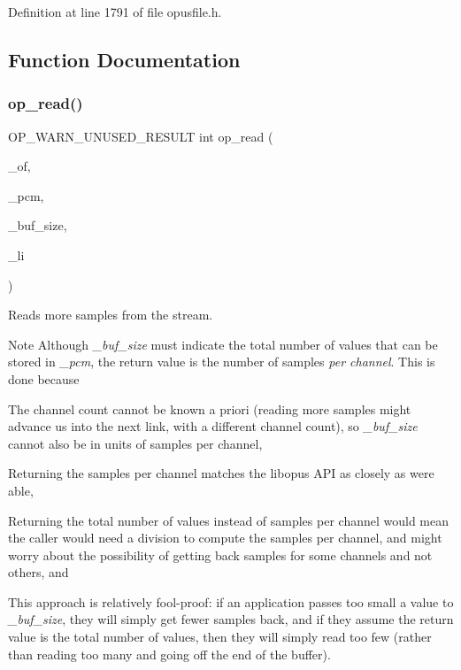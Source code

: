 Definition at line 1791 of file opusfile.\+h.



\subsection{Function Documentation}
\mbox{\label{group__stream__decoding_ga963c917749335e29bb2b698c1cb20a10}} 
\subsubsection{\texorpdfstring{op\_read()}{op\_read()}}
{\footnotesize\ttfamily O\+P\+\_\+\+W\+A\+R\+N\+\_\+\+U\+N\+U\+S\+E\+D\+\_\+\+R\+E\+S\+U\+LT int op\+\_\+read (\begin{DoxyParamCaption}\item[{Ogg\+Opus\+File $\ast$}]{\+\_\+of,  }\item[{\mbox{\hyperlink{opus__types_8h_acc9ed7cf60479eb81f9648c6ec27dc26}{opus\+\_\+int16}} $\ast$}]{\+\_\+pcm,  }\item[{int}]{\+\_\+buf\+\_\+size,  }\item[{int $\ast$}]{\+\_\+li }\end{DoxyParamCaption})}

Reads more samples from the stream. \begin{DoxyNote}{Note}
Although {\itshape \+\_\+buf\+\_\+size} must indicate the total number of values that can be stored in {\itshape \+\_\+pcm}, the return value is the number of samples {\itshape per channel}. This is done because 
\begin{DoxyEnumerate}
\item The channel count cannot be known a priori (reading more samples might advance us into the next link, with a different channel count), so {\itshape \+\_\+buf\+\_\+size} cannot also be in units of samples per channel, 
\item Returning the samples per channel matches the {\ttfamily libopus} A\+PI as closely as we\textquotesingle{}re able, 
\item Returning the total number of values instead of samples per channel would mean the caller would need a division to compute the samples per channel, and might worry about the possibility of getting back samples for some channels and not others, and 
\item This approach is relatively fool-\/proof\+: if an application passes too small a value to {\itshape \+\_\+buf\+\_\+size}, they will simply get fewer samples back, and if they assume the return value is the total number of values, then they will simply read too few (rather than reading too many and going off the end of the buffer). 
\end{DoxyEnumerate}
\end{DoxyNote}

